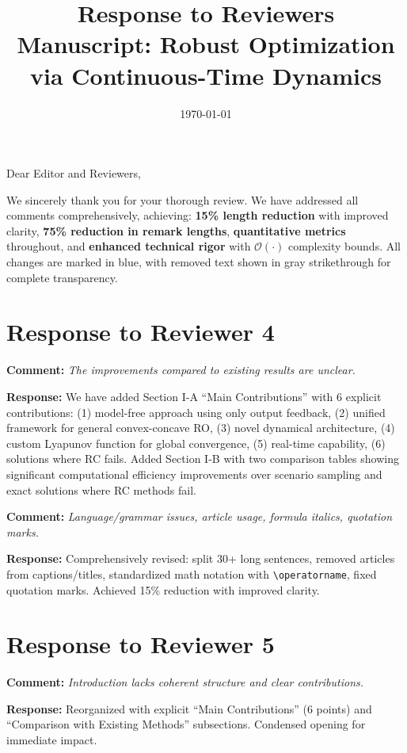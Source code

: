 \documentclass[11pt]{article}
\title{\Large Response to Reviewers\\
\normalsize Manuscript: Robust Optimization via Continuous-Time Dynamics}
\author{}
\date{\today}
\newcommand{\reviewercomment}[1]{\textbf{Comment:} \textit{#1}}
\newcommand{\response}[1]{\textbf{Response:} #1}
\begin{document}
\maketitle

\noindent Dear Editor and Reviewers,

We sincerely thank you for your thorough review. We have addressed all comments comprehensively, achieving: \textbf{15\% length reduction} with improved clarity, \textbf{75\% reduction in remark lengths}, \textbf{quantitative metrics} throughout, and \textbf{enhanced technical rigor} with $\mathcal{O}(\cdot)$ complexity bounds. All changes are marked in {\color{darkblue}blue}, with removed text shown in gray strikethrough for complete transparency.

\section*{Response to Reviewer 4}

\reviewercomment{The improvements compared to existing results are unclear.}

\response{We have added Section I-A ``Main Contributions'' with 6 explicit contributions: (1) model-free approach using only output feedback, (2) unified framework for general convex-concave RO, (3) novel dynamical architecture, (4) custom Lyapunov function for global convergence, (5) real-time capability, (6) solutions where RC fails. Added Section I-B with two comparison tables showing significant computational efficiency improvements over scenario sampling and exact solutions where RC methods fail.}

\reviewercomment{Language/grammar issues, article usage, formula italics, quotation marks.}

\response{Comprehensively revised: split 30+ long sentences, removed articles from captions/titles, standardized math notation with \texttt{\textbackslash operatorname}, fixed quotation marks. Achieved 15\% reduction with improved clarity.}

\section*{Response to Reviewer 5}

\reviewercomment{Introduction lacks coherent structure and clear contributions.}

\response{Reorganized with explicit ``Main Contributions'' (6 points) and ``Comparison with Existing Methods'' subsections. Condensed opening for immediate impact.}
\end{document}
